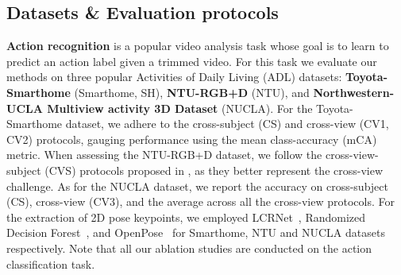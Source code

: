 \documentclass{article}
\begin{document}
\subsection{Datasets \& Evaluation protocols}
\textbf{Action recognition} is a popular video analysis task whose goal is to learn to predict an action label given a trimmed video.
For this task we evaluate our methods on three popular Activities of Daily Living (ADL) datasets: \textbf{Toyota-Smarthome} \cite{smarthome} (Smarthome, SH), \textbf{NTU-RGB+D} \cite{NTU_RGB+D} (NTU), and \textbf{Northwestern-UCLA Multiview activity 3D Dataset} \cite{nucla} (NUCLA). For the Toyota-Smarthome dataset, we adhere to the cross-subject (CS) and cross-view (CV1, CV2) protocols, gauging performance using the mean class-accuracy (mCA) metric. When assessing the NTU-RGB+D dataset, we follow the cross-view-subject (CVS) protocols proposed in \cite{varol21_surreact}, as they better represent the cross-view challenge. As for the NUCLA dataset, we report the accuracy on cross-subject (CS), cross-view (CV3), and the average across all the cross-view protocols. For the extraction of 2D pose keypoints, we employed LCRNet~\cite{lcrnet_new}, Randomized Decision Forest~\cite{37}, and OpenPose~\cite{OpenPose} for Smarthome, NTU and NUCLA datasets respectively. Note that all our ablation studies are conducted on the action classification task. 
\end{document}
